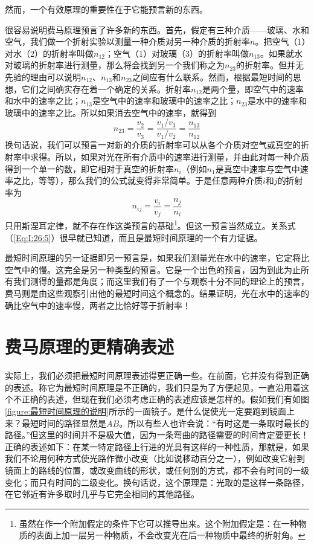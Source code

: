 然而，一个有效原理的重要性在于它能预言新的东西。

很容易说明费马原理预言了许多新的东西。首先，假定有三种介质——玻璃、水和空气，我们做一个折射实验以测量一种介质对另一种介质的折射率$n$。把空气（1）对水（2）的折射率叫做$n_{12}$；空气（1）对玻璃（3）的折射率叫做$n_{13}$。如果就水对玻璃的折射率进行测量，那么将会找到另一个我们称之为$n_{23}$的折射率。但并无先验的理由可以说明$n_{12}$、$n_{13}$和$n_{23}$之间应有什么联系。然而，根据最短时间的思想，它们之间确实存在着一个确定的关系。折射率$n_{12}$是两个量，即空气中的速率和水中的速率之比；$n_{13}$是空气中的速率和玻璃中的速率之比；$n_{23}$是水中的速率和玻璃中的速率之比。所以如果消去空气中的速率，就得到
\begin{equation}
    \label{Eq:I:26:5}
    n_{23} = \frac{v_2}{v_3} = \frac{v_1/v_3}{v_1/v_2} = \frac{n_{13}}{n_{12}}
\end{equation}
换句话说，我们可以预言一对新的介质的折射率可以从各个介质对空气或真空的折射率中求得。所以，如果对光在所有介质中的速率进行测量，并由此对每一种介质得到一个单一的数，即它相对于真空的折射率$n_i$（例如$n_1$是真空中速率与空气中速率之比，等等），那么我们的公式就变得非常简单。于是任意两种介质$i$和$j$的折射率为
\begin{equation}
    \label{Eq:I:26:6}
    n_{ij} = \frac{v_i}{v_j} = \frac{n_j}{n_i} 
\end{equation}
只用斯涅耳定律，就不存在作这类预言的基础\footnote{虽然在作一个附加假定的条件下它可以推导出来。这个附加假定是：在一种物质的表面上加一层另一种物质，不会改变光在后一种物质中最终的折射角。}。但这一预言当然成立。关系式（\ref{Eq:I:26:5}）很早就已知道，而且是最短时间原理的一个有力证据。

最短时间原理的另一证据即另一预言是，如果我们测量光在水中的速率，它定将比空气中的慢。这完全是另一种类型的预言。它是一个出色的预言，因为到此为止所有我们测得的量都是角度；而这里我们有了一个与观察十分不同的理论上的预言，费马则是由这些观察引出他的最短时间这个概念的。结果证明，光在水中的速率的确比空气中的速率慢，两者之比恰好等于折射率！

\section{费马原理的更精确表述}

实际上，我们必须把最短时间原理表述得更正确一些。在前面，它并没有得到正确的表述。称它为最短时间原理是不正确的，我们只是为了方便起见，一直沿用着这个不正确的表述，但现在我们必须考虑正确的表述应该是怎样的。假如我们有如图\ref{figure:最短时间原理的说明}所示的一面镜子。是什么促使光一定要跑到镜面上来？最短时间的路径显然是$AB$。所以有些人也许会说：“有时这是一条取时最长的路径。”但这里的时间并不是极大值，因为一条弯曲的路径需要的时间肯定要更长！正确的表述如下：在某一特定路径上行进的光具有这样的一种性质，那就是，如果我们不论用何种方式使光路作微小改变（比如说移动百分之一），例如改变它射到镜面上的路线的位置，或改变曲线的形状，或任何别的方式，都不会有时间的一级变化；而只有时间的二级变化。换句话说，这个原理是：光取的是这样一条路径，在它邻近有许多取时几乎与它完全相同的其他路径。


